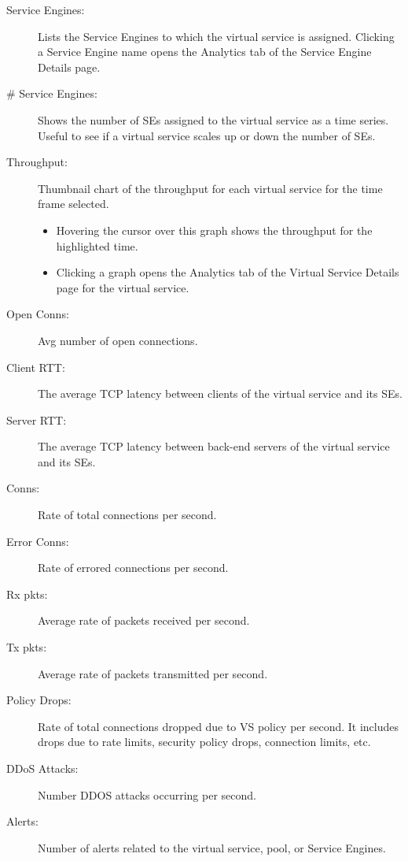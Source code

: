 \documentclass[letterpaper,10pt,english]{sphinxmanual}
\begin{document}
\begin{description}
\item[{Service Engines:}] \leavevmode
Lists the Service Engines to which the virtual service is assigned. Clicking a Service Engine name opens the Analytics tab of the Service Engine Details page.

\item[{\# Service Engines:}] \leavevmode
Shows the number of SEs assigned to the virtual service as a time series. Useful to see if a virtual service scales up or down the number of SEs.

\item[{Throughput:}] \leavevmode
Thumbnail chart of the throughput for each virtual service for the time frame selected.
\begin{itemize}
\item {} 
Hovering the cursor over this graph shows the throughput for the highlighted time.

\item {} 
Clicking a graph opens the Analytics tab of the Virtual Service Details page for the virtual service.

\end{itemize}

\item[{Open Conns:}] \leavevmode
Avg number of open connections.

\item[{Client RTT:}] \leavevmode
The average TCP latency between clients of the virtual service and its SEs.

\item[{Server RTT:}] \leavevmode
The average TCP latency between back-end servers of the virtual service and its SEs.

\item[{Conns:}] \leavevmode
Rate of total connections per second.

\item[{Error Conns:}] \leavevmode
Rate of errored connections per second.

\item[{Rx pkts:}] \leavevmode
Average rate of packets received per second.

\item[{Tx pkts:}] \leavevmode
Average rate of packets transmitted per second.

\item[{Policy Drops:}] \leavevmode
Rate of total connections dropped due to VS policy per second. It includes drops due to rate limits, security policy drops, connection limits, etc.

\item[{DDoS Attacks:}] \leavevmode
Number DDOS attacks occurring per second.

\item[{Alerts:}] \leavevmode
Number of alerts related to the virtual service, pool, or Service Engines.

\end{description}
\end{document}
